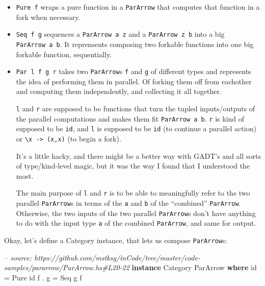 \documentclass[]{article}
\newenvironment{Shaded}{}{}
\newcommand{\KeywordTok}[1]{\textcolor[rgb]{0.00,0.44,0.13}{\textbf{{#1}}}}
\newcommand{\DataTypeTok}[1]{\textcolor[rgb]{0.56,0.13,0.00}{{#1}}}
\newcommand{\CommentTok}[1]{\textcolor[rgb]{0.38,0.63,0.69}{\textit{{#1}}}}
\newcommand{\FunctionTok}[1]{\textcolor[rgb]{0.02,0.16,0.49}{{#1}}}
\newcommand{\NormalTok}[1]{{#1}}
\begin{document}
\begin{itemize}
\item
  \texttt{Pure\ f} wraps a pure function in a \texttt{ParArrow} that computes
  that function in a fork when necessary.
\item
  \texttt{Seq\ f\ g} sequences a \texttt{ParArrow\ a\ z} and a
  \texttt{ParArrow\ z\ b} into a big \texttt{ParArrow\ a\ b}. It reprensents
  composing two forkable functions into one big forkable function, sequentially.
\item
  \texttt{Par\ l\ f\ g\ r} takes two \texttt{ParArrow}s \texttt{f} and
  \texttt{g} of different types and represents the idea of performing them in
  parallel. Of forking them off from eachother and computing them independently,
  and collecting it all together.

  \texttt{l} and \texttt{r} are supposed to be functions that turn the tupled
  inputs/outputs of the parallel computations and makes them fit
  \texttt{ParArrow\ a\ b}. \texttt{r} is kind of supposed to be \texttt{id}, and
  \texttt{l} is supposed to be \texttt{id} (to continue a parallel action) or
  \texttt{\textbackslash{}x\ -\textgreater{}\ (x,x)} (to begin a fork).

  It's a little hacky, and there might be a better way with GADT's and all sorts
  of type/kind-level magic, but it was the way I found that I understood the
  most.

  The main purpose of \texttt{l} and \texttt{r} is to be able to meaningfully
  refer to the two parallel \texttt{ParArrow}s in terms of the \texttt{a} and
  \texttt{b} of the ``combined'' \texttt{ParArrow}. Otherwise, the two inputs of
  the two parallel \texttt{ParArrow}s don't have anything to do with the input
  type \texttt{a} of the combined \texttt{ParArrow}, and same for output.
\end{itemize}

Okay, let's define a Category instance, that lets us compose \texttt{ParArrow}s:

\begin{Shaded}
\begin{Highlighting}[]
\CommentTok{-- source: https://github.com/mstksg/inCode/tree/master/code-samples/pararrow/ParArrow.hs#L20-22}
\KeywordTok{instance} \DataTypeTok{Category} \DataTypeTok{ParArrow} \KeywordTok{where}
    \NormalTok{id    }\FunctionTok{=} \DataTypeTok{Pure} \NormalTok{id}
    \NormalTok{f }\FunctionTok{.} \NormalTok{g }\FunctionTok{=} \DataTypeTok{Seq} \NormalTok{g f}
\end{Highlighting}
\end{Shaded}
\end{document}
